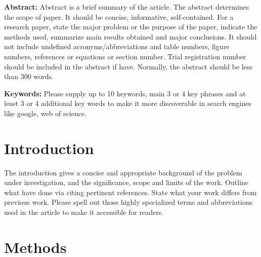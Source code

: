 \documentclass{ELSP}
\begin{document}
\noindent\textbf{\textbf{\textcolor[RGB]{0,131,255}{Abstract:}}} Abstract is a brief summary of the article. The
abstract determines the scope of paper. It should be concise,
informative, self-contained. For a research paper, state the major
problem or the purpose of the paper, indicate the methods used,
summarize main results obtained and major conclusions. It should not
include undefined acronyms/abbreviations and table numbers, figure
numbers, references or equations or section number. Trial registration
number should be included in the abstract if have. Normally, the
abstract should be less than 300 words.

\noindent\textbf{\textcolor[RGB]{0,131,255}{Keywords:}} Please supply up to 10 keywords, main 3 or 4 key phrases and at least 3 or 4 additional key words to make it more discoverable in search engines like google, web of science. 


\section{Introduction}

The introduction gives a concise and appropriate background of the
problem under investigation, and the significance, scope and limits of
the work. Outline what have done via citing pertinent references. State what your work differs from previous work. Please spell out those highly specialized terms and abbreviations used in the article to make it
accessible for readers.




\section{Methods}
\end{document}
